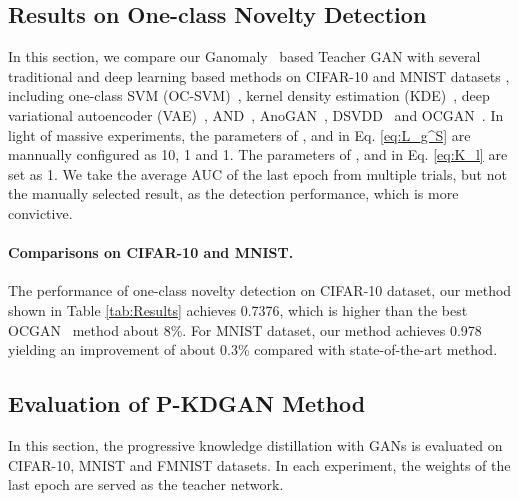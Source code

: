 \documentclass{article}
\begin{document}
	
\subsection{Results on One-class Novelty Detection}
	In this section, we compare our Ganomaly~\cite{ganomaly:2018} based Teacher GAN with several traditional and deep learning based methods on CIFAR-10 and MNIST datasets , including one-class SVM (OC-SVM)~\cite{OCSVM:2001}, kernel density estimation (KDE)~\cite{KDE:1962}, deep variational autoencoder (VAE)~\cite{VAE:2013}, AND~\cite{AND:2019}, AnoGAN~\cite{AnoGAN:2017}, DSVDD~\cite{DSVDD:2018} and OCGAN~\cite{OCGAN:2019}. In light of massive experiments, the parameters of ,  and  in Eq. \ref{eq:L_g^S} are mannually configured as 10, 1 and 1. The parameters of ,  and  in Eq. \ref{eq:K_l} are set as 1. We take the average AUC of the last epoch from multiple trials, but not the manually selected result, as the detection performance, which is more convictive.
	
	\paragraph{Comparisons on CIFAR-10 and MNIST.} The performance of one-class novelty detection on CIFAR-10 dataset, our method shown in Table \ref{tab:Results} achieves 0.7376, which is higher than the best OCGAN~\cite{OCGAN:2019} method about 8\%. For MNIST dataset, our method achieves 0.978 yielding an improvement of about 0.3\% compared with state-of-the-art method.
	
	
	\subsection{Evaluation of P-KDGAN Method}
	\label{sec:4.4}
	In this section, the progressive knowledge distillation with GANs is evaluated on CIFAR-10, MNIST and FMNIST datasets. In each experiment, the weights of the last epoch are served as the teacher network.
	
\end{document}
